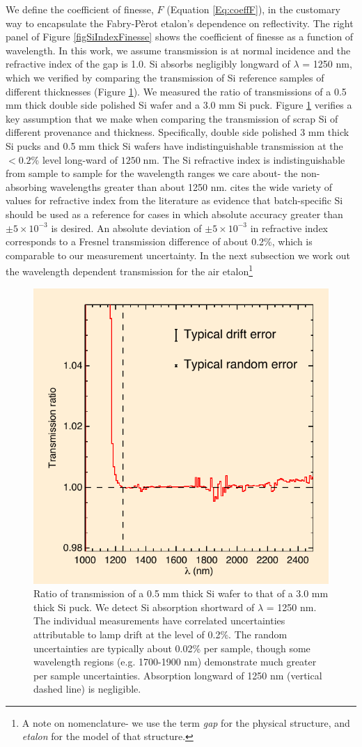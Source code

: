 \documentclass[osajnl,preprint,showpacs,superscriptaddress,12pt]{revtex4-1} %
\begin{document}
We define the coefficient of finesse\cite{2007fuph.book.....S}, $F$ (Equation \ref{Eq:coeffF}), in the customary way to encapsulate the Fabry-P\`{e}rot etalon's dependence on reflectivity.  The right panel of Figure \ref{figSiIndexFinesse} shows the coefficient of finesse as a function of wavelength.  In this work, we assume transmission is at normal incidence and the refractive index of the gap is 1.0.  Si absorbs negligibly longward of $\lambda$ = 1250 nm, which we verified by comparing the transmission of Si reference samples of different thicknesses (Figure \ref{figSiAbsorbfig}).  We measured the ratio of transmissions of a 0.5 mm thick double side polished Si wafer and a 3.0 mm Si puck.  Figure \ref{figSiAbsorbfig} verifies a key assumption that we make when comparing the transmission of scrap Si of different provenance and thickness.  Specifically, double side polished 3 mm thick Si pucks and 0.5 mm thick Si wafers have indistinguishable transmission at the $<0.2$\% level long-ward of $1250\;$nm.  The Si refractive index is indistinguishable from sample to sample for the wavelength ranges we care about- the non-absorbing wavelengths greater than about 1250 nm.  \cite{2006SPIE.6273E..77F} cites the wide variety of values for refractive index from the literature as evidence that batch-specific Si should be used as a reference for cases in which absolute accuracy greater than $\pm5\times10^{-3}$ is desired.  An absolute deviation of $\pm5\times10^{-3}$ in refractive index corresponds to a Fresnel transmission difference of about 0.2\%, which is comparable to our measurement uncertainty.  In the next subsection we work out the wavelength dependent transmission for the air etalon\footnote{A note on nomenclature- we use the term \emph{gap} for the physical structure, and \emph{etalon} for the model of that structure.}

\begin{figure}[htbp]
\includegraphics[width=0.40\columnwidth]{figs/fpAbsorbfig_alt}
\caption{Ratio of transmission of a 0.5 mm thick Si wafer to that of a 3.0 mm thick Si puck.  \label{figSiAbsorbfig} We detect Si absorption shortward of $\lambda$ = 1250 nm.  The individual measurements have correlated uncertainties attributable to lamp drift at the level of 0.2\%.  The random uncertainties are typically about 0.02\% per sample, though some wavelength regions (e.g. 1700-1900 nm) demonstrate much greater per sample uncertainties.  Absorption longward of 1250 nm (vertical dashed line) is negligible.}
\end{figure}
\end{document}

